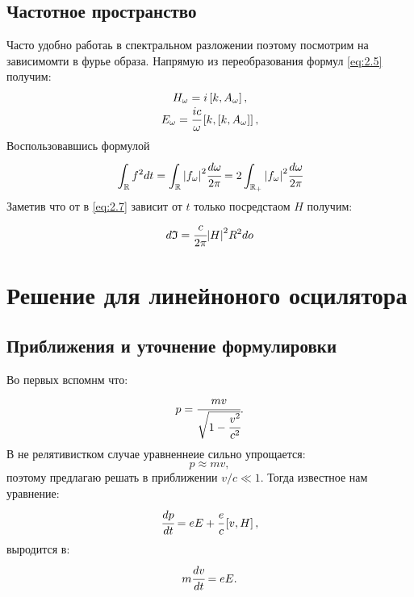 \documentclass[a4paper]{article}
\newcommand{\insqr}[1]{\left[ #1 \right]}
\newcommand{\re}{\mathbb{R}}
\numberwithin{equation}{section}
\begin{document}
\subsection{Частотное пространство}

Часто удобно работаь в спектральном разложении поэтому посмотрим 
на зависимомти в фурье образа. Напрямую из переобразования формул 
\ref{eq:2.5} получим:
\begin{gather}
    \begin{matrix}
        H_\omega = i \insqr{k, A_\omega},\\
        E_\omega = \cfrac{ic}{\omega} \insqr{k, \insqr{k, A_\omega}},
    \end{matrix}
\end{gather}
Воспользовавшись формулой 
\begin{equation}
    \int_\re f^2 dt = \int_\re \abs{f_\omega}^2 \cfrac{d\omega}{2\pi} 
    = 2\int_{\re_+} \abs{f_\omega}^2 \cfrac{d\omega}{2\pi} 
\end{equation}
Заметив что от в \ref{eq:2.7}  зависит от $t$ только посредстаом $H$ 
получим:
\begin{equation}
    d\mathfrak{I} = \cfrac{c}{2\pi} \abs{H}^2R^2do
    \label{eq:if}
\end{equation}



\section{Решение для линейноного осцилятора}
\subsection{Приближения и уточнение формулировки}

Во первых вспомнм что:
\begin{equation}
    p  = \cfrac{mv}{\sqrt{1 - \cfrac{v^2}{c^2}}}.
\end{equation}
В не релятивистком случае уравненнеие сильно упрощается:
\begin{equation}
    p \approx mv,
\end{equation}
поэтому предлагаю решать в приближении $v/c \ll 1$.
Тогда известное нам уравнение:
\begin{equation}
    \cfrac{dp}{dt} = e  E + \cfrac{e}{c} \insqr{ v,  H},
\end{equation}
выродится в: 
\begin{equation}
    m\cfrac{dv}{dt} = e  E.
\end{equation}
\end{document}
